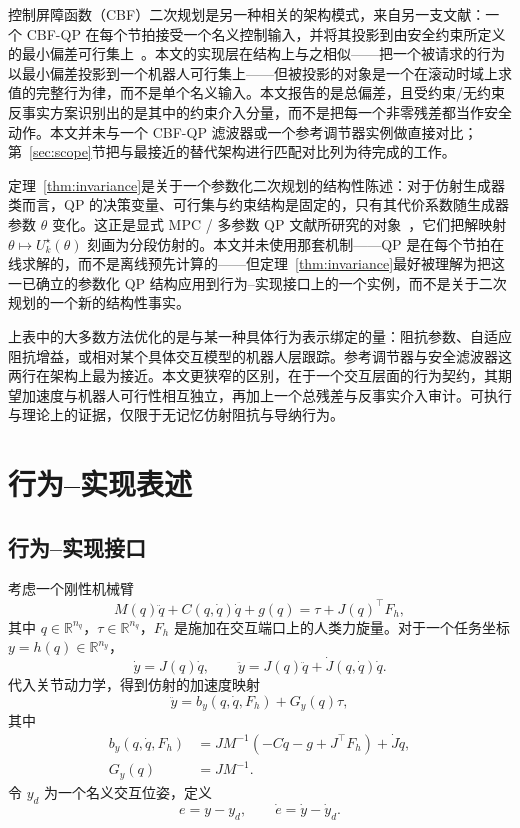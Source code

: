 \documentclass[journal]{IEEEtran}
\begin{document}
控制屏障函数（CBF）二次规划是另一种相关的架构模式，来自另一支文献：一个 CBF-QP 在每个节拍接受一个名义控制输入，并将其投影到由安全约束所定义的最小偏差可行集上~\cite{ref10}。本文的实现层在结构上与之相似——把一个被请求的行为以最小偏差投影到一个机器人可行集上——但被投影的对象是一个在滚动时域上求值的完整行为律，而不是单个名义输入。本文报告的是总偏差，且受约束/无约束反事实方案识别出的是其中的约束介入分量，而不是把每一个非零残差都当作安全动作。本文并未与一个 CBF-QP 滤波器或一个参考调节器实例做直接对比；第~\ref{sec:scope}节把与最接近的替代架构进行匹配对比列为待完成的工作。

定理~\ref{thm:invariance}是关于一个参数化二次规划的结构性陈述：对于仿射生成器类而言，QP 的决策变量、可行集与约束结构是固定的，只有其代价系数随生成器参数 $\theta$ 变化。这正是显式 MPC / 多参数 QP 文献所研究的对象~\cite{ref11,ref12}，它们把解映射 $\theta\mapsto U_k^\star(\theta)$ 刻画为分段仿射的。本文并未使用那套机制——QP 是在每个节拍在线求解的，而不是离线预先计算的——但定理~\ref{thm:invariance}最好被理解为把这一已确立的参数化 QP 结构应用到行为--实现接口上的一个实例，而不是关于二次规划的一个新的结构性事实。

上表中的大多数方法优化的是与某一种具体行为表示绑定的量：阻抗参数、自适应阻抗增益，或相对某个具体交互模型的机器人层跟踪。参考调节器与安全滤波器这两行在架构上最为接近。本文更狭窄的区别，在于一个交互层面的行为契约，其期望加速度与机器人可行性相互独立，再加上一个总残差与反事实介入审计。可执行与理论上的证据，仅限于无记忆仿射阻抗与导纳行为。

\section{行为--实现表述}
\label{sec:behaviors}

\subsection{行为--实现接口}
\label{sec:interface}

考虑一个刚性机械臂
\begin{equation}
M(q)\ddot q+C(q,\dot q)\dot q+g(q) =\tau+J(q)^\top F_h,
\end{equation}
其中 $q\in\mathbb R^{n_q}$，$\tau\in\mathbb R^{n_q}$，$F_h$ 是施加在交互端口上的人类力旋量。对于一个任务坐标
$y=h(q)\in\mathbb R^{n_y}$，
\begin{equation}
\dot y=J(q)\dot q, \qquad \ddot y=J(q)\ddot q+\dot J(q,\dot q)\dot q.
\end{equation}
代入关节动力学，得到仿射的加速度映射
\begin{equation}
\ddot y =b_y(q,\dot q,F_h)+G_y(q)\tau,
\end{equation}
其中
\begin{align}
b_y(q,\dot q,F_h) &= J M^{-1}\left(-C\dot q-g+J^\top F_h\right)+\dot J\dot q,\\
G_y(q)&=JM^{-1}.
\end{align}
令 $y_d$ 为一个名义交互位姿，定义
\begin{equation}
e=y-y_d, \qquad \dot e=\dot y-\dot y_d.
\end{equation}
\end{document}
